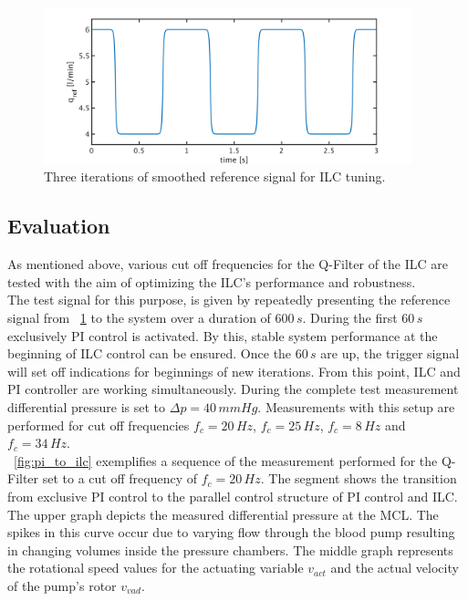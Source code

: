 \begin{figure}[ht]
  \centering
  \includegraphics[width=0.95\textwidth]{images/chapt_5/ILC/ref_signal_ILC3.pdf}
  \caption[Smoothed reference signal for ILC tuning]{Three iterations of smoothed reference signal for ILC tuning.}
  \label{fig:ref_signal_ILC3}
\end{figure}
\subsection{Evaluation}
As mentioned above, various cut off frequencies for the Q-Filter of the ILC are tested with the aim of optimizing the ILC's performance and robustness.  \\The test signal for this purpose, is given by repeatedly presenting the reference signal from \figurename~\ref{fig:ref_signal_ILC3} to the system over a duration of $600\,s$. During the first $60\,s$ exclusively PI control is activated. By this, stable system performance at the beginning of ILC control can be ensured. Once the $60\,s$ are up, the trigger signal will set off indications for beginnings of new iterations. From this point, ILC and PI controller are working simultaneously. During the complete test measurement differential pressure is set to $\Delta{p}=40\,mmHg$. Measurements with this setup are performed for cut off frequencies $f_{c}=20\,Hz$, $f_{c}=25\,Hz$, $f_{c}=8\,Hz$ and $f_{c}=34\,Hz$.
\\\figurename~\ref{fig:pi_to_ilc} exemplifies a sequence of the measurement performed for the Q-Filter set to a cut off frequency of $f_c=20\,Hz$. The segment shows the transition from exclusive PI control to the parallel control structure of PI control and ILC. The upper graph depicts the measured differential pressure at the MCL. The spikes in this curve occur due to varying flow through the blood pump resulting in changing volumes inside the pressure chambers. The middle graph represents the rotational speed values for the actuating variable $v_{act}$ and the actual velocity of the pump's rotor $v_{vad}$.

